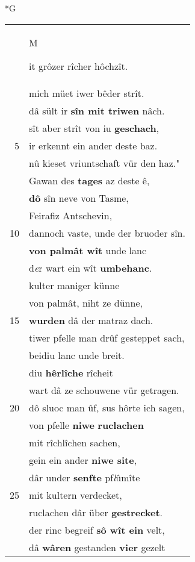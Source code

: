 \documentclass[8pt,a4paper,notitlepage]{article}
\begin{document}
\begin{table}[ht]
\begin{minipage}[t]{0.5\linewidth}
\small
\begin{center}*G
\end{center}
\begin{tabular}{rl}
 & \begin{large}M\end{large}it grôzer rîcher hôchzît.\\ 
 & mich müet iwer bêder strît.\\ 
 & dâ sült ir \textbf{sîn mit triwen} nâch.\\ 
 & sît aber strît von iu \textbf{geschach},\\ 
5 & ir erkennt ein ander deste baz.\\ 
 & nû kieset vriuntschaft vür den haz."\\ 
 & Gawan des \textbf{tages} az deste ê,\\ 
 & \textbf{dô} sîn neve von Tasme,\\ 
 & Feirafiz Antschevin,\\ 
10 & dannoch vaste, unde der bruoder sîn.\\ 
 & \textbf{von palmât wît} unde lanc\\ 
 & d\textit{e}r wart ein wît \textbf{umbehanc}.\\ 
 & kulter maniger künne\\ 
 & von palmât, niht ze dünne,\\ 
15 & \textbf{wurden} dâ der matraz dach.\\ 
 & tiwer pfelle man drûf gesteppet sach,\\ 
 & beidiu lanc unde breit.\\ 
 & diu \textbf{hêrlîche} rîcheit\\ 
 & wart dâ ze schouwene vür getragen.\\ 
20 & dô sluoc man ûf, sus hôrte ich sagen,\\ 
 & von pfelle \textbf{niwe} \textbf{ruclachen}\\ 
 & mit rîchlîchen sachen,\\ 
 & gein ein ander \textbf{niwe site},\\ 
 & dâr under \textbf{senfte} pf\textit{l}ûmîte\\ 
25 & mit kultern verdecket,\\ 
 & ruclachen dâr über \textbf{gestrecket}.\\ 
 & der rinc begreif \textbf{sô wît ein} velt,\\ 
 & dâ \textbf{wâren} gestanden \textbf{vier} gezelt\\ 

\end{tabular}
\end{minipage}
\end{table}
\end{document}
